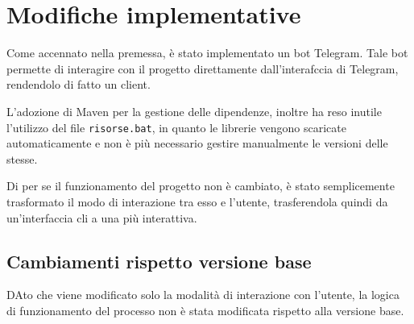 \section{Modifiche implementative}

Come accennato nella premessa, è stato implementato un bot Telegram. Tale bot permette di interagire con il progetto direttamente dall'interafccia di Telegram, rendendolo di fatto un client. 

L'adozione di Maven per la gestione delle dipendenze, inoltre ha reso inutile l'utilizzo del file \texttt{risorse.bat}, in quanto le librerie vengono scaricate automaticamente e non è più necessario gestire manualmente le versioni delle stesse.

Di per se il funzionamento del progetto non è cambiato, è stato semplicemente trasformato il modo di interazione tra esso e l'utente, trasferendola quindi da un'interfaccia cli a una più interattiva.  


\subsection{Cambiamenti rispetto versione base}

DAto che viene modificato solo la modalità di interazione con l'utente, la logica  di funzionamento del processo non è stata modificata rispetto alla versione base.



